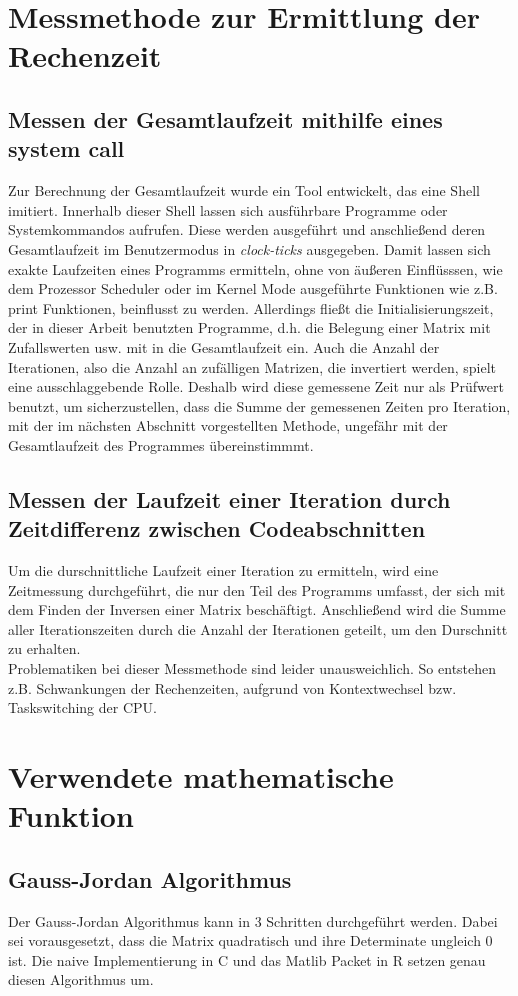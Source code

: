 \chapter{Messmethode zur Ermittlung der Rechenzeit}
\section{Messen der Gesamtlaufzeit mithilfe eines system call}
Zur Berechnung der Gesamtlaufzeit wurde ein Tool entwickelt, das eine Shell imitiert. Innerhalb dieser Shell lassen sich ausführbare Programme oder Systemkommandos aufrufen. Diese werden ausgeführt und anschließend deren Gesamtlaufzeit im Benutzermodus in \emph{clock-ticks} ausgegeben. Damit lassen sich exakte Laufzeiten eines Programms ermitteln, ohne von äußeren Einflüsssen, wie dem Prozessor Scheduler oder im Kernel Mode ausgeführte Funktionen wie z.B. print Funktionen, beinflusst zu werden. Allerdings fließt die Initialisierungszeit, der in dieser Arbeit benutzten Programme, d.h. die Belegung einer Matrix mit Zufallswerten usw. mit in die Gesamtlaufzeit ein. Auch die Anzahl der Iterationen, also die Anzahl an zufälligen Matrizen, die invertiert werden, spielt eine ausschlaggebende Rolle. Deshalb wird diese gemessene Zeit nur als Prüfwert benutzt, um sicherzustellen, dass die Summe der gemessenen Zeiten pro Iteration, mit der im nächsten Abschnitt vorgestellten Methode, ungefähr mit der Gesamtlaufzeit des Programmes übereinstimmmt.
\section{Messen der Laufzeit einer Iteration durch Zeitdifferenz zwischen Codeabschnitten}
Um die durschnittliche Laufzeit einer Iteration zu ermitteln, wird eine Zeitmessung durchgeführt, die nur den Teil des Programms umfasst, der sich mit dem Finden der Inversen einer Matrix beschäftigt. Anschließend wird die Summe aller Iterationszeiten durch die Anzahl der Iterationen geteilt, um den Durschnitt zu erhalten.\\
Problematiken bei dieser Messmethode sind leider unausweichlich. So entstehen z.B. Schwankungen der Rechenzeiten, aufgrund von Kontextwechsel bzw. Taskswitching der CPU.

\chapter{Verwendete mathematische Funktion}
\section{Gauss-Jordan Algorithmus}
Der Gauss-Jordan Algorithmus kann in 3 Schritten durchgeführt werden.
Dabei sei vorausgesetzt, dass die Matrix quadratisch und ihre Determinate ungleich 0 ist. Die naive Implementierung in C und das Matlib Packet in R setzen genau diesen Algorithmus um.

